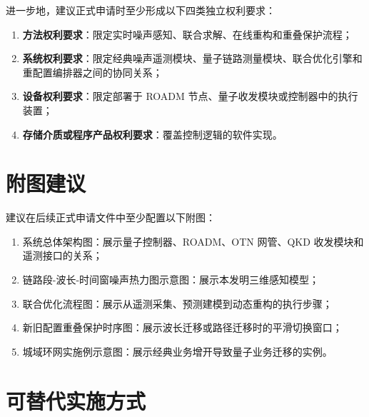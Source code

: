\documentclass[12pt,a4paper]{article}
\begin{document}
进一步地，建议正式申请时至少形成以下四类独立权利要求：
\begin{enumerate}[label=(\arabic*)]
    \item \textbf{方法权利要求}：限定实时噪声感知、联合求解、在线重构和重叠保护流程；
    \item \textbf{系统权利要求}：限定经典噪声遥测模块、量子链路测量模块、联合优化引擎和重配置编排器之间的协同关系；
    \item \textbf{设备权利要求}：限定部署于 ROADM 节点、量子收发模块或控制器中的执行装置；
    \item \textbf{存储介质或程序产品权利要求}：覆盖控制逻辑的软件实现。
\end{enumerate}

\section{附图建议}

建议在后续正式申请文件中至少配置以下附图：
\begin{enumerate}[label=(\arabic*)]
    \item 系统总体架构图：展示量子控制器、ROADM、OTN 网管、QKD 收发模块和遥测接口的关系；
    \item 链路段-波长-时间窗噪声热力图示意图：展示本发明三维感知模型；
    \item 联合优化流程图：展示从遥测采集、预测建模到动态重构的执行步骤；
    \item 新旧配置重叠保护时序图：展示波长迁移或路径迁移时的平滑切换窗口；
    \item 城域环网实施例示意图：展示经典业务增开导致量子业务迁移的实例。
\end{enumerate}

\section{可替代实施方式}
\end{document}
